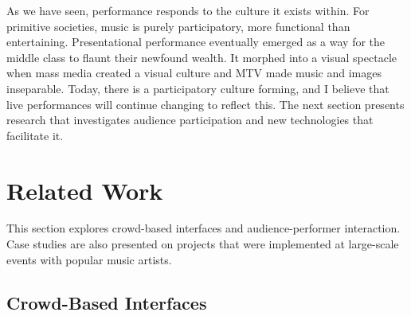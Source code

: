 
As we have seen, performance responds to the culture it exists within. For primitive societies, music is purely participatory, more functional than entertaining. Presentational performance eventually emerged as a way for the middle class to flaunt their newfound wealth. It morphed into a visual spectacle when mass media created a visual culture and MTV made music and images inseparable. Today, there is a participatory culture forming, and I believe that live performances will continue changing to reflect this. The next section presents research that investigates audience participation and new technologies that facilitate it.


\section{Related Work}

This section explores crowd-based interfaces and audience-performer interaction. Case studies are also presented on projects that were implemented at large-scale events with popular music artists.

\subsection{Crowd-Based Interfaces}

